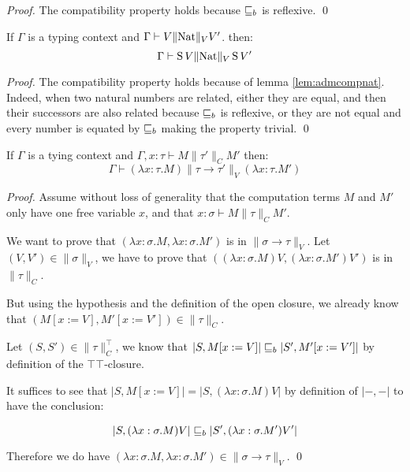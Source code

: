 \begin{proof}
The compatibility property holds 
because $\sqsubseteq_b$ is reflexive. 
\qed\end{proof}

\begin{alemma}
    If $\Gamma$ is a typing context and $\Gamma \vdash V \| \textnormal{Nat} \|_V V'$. 
    then:
    \begin{equation*}
        \Gamma \vdash \operatorname{S} V \| \textnormal{Nat} \|_V \operatorname{S} V'
    \end{equation*}
\end{alemma}
\begin{proof}
The compatibility property
holds because of lemma \ref{lem:admcompnat}. Indeed, 
when two natural numbers are related, either they 
are equal, and then their successors are also related 
because $\sqsubseteq_b$ is reflexive, or they are not 
equal and every number is equated by $\sqsubseteq_b$ 
making the property trivial. 
\qed\end{proof}

\begin{alemma}
    If $\Gamma$ is a tying context and 
    $\Gamma, x :\tau \vdash M \| \tau' \|_C M'$ then:
    \begin{equation*}
        \Gamma \vdash (\lambda x:\tau. M) \| \tau \to \tau' \|_V (\lambda
        x:\tau. M')
    \end{equation*}
\end{alemma}
\begin{proof}
Assume without loss of generality 
that the computation terms 
$M$ and $M'$ only have one free variable $x$,
and that $x : \sigma \vdash M \| \tau \|_C M'$.

We want to prove that $(\lambda x:\sigma .M, \lambda x:\sigma. M')$
is in $\| \sigma \to \tau\|_V$. Let $(V,V') \in \| \sigma \|_V$,
we have to prove that $((\lambda x:\sigma. M)V, (\lambda x:\sigma.
M')V')$ is in $\| \tau \|_C$.

But using the hypothesis and 
the definition of the open closure, 
we already know that 
$(M[x := V], M'[x := V']) \in \| \tau \|_C$.

Let $(S,S') \in \| \tau \|_C^\top$, we know that 
$|S, M[x := V]| \sqsubseteq_b |S', M'[x := V']|$ by definition 
of the $\top\top$-closure. 

It suffices to see that $|S, M[x := V]| = |S, (\lambda x:\sigma. M)
V|$ by definition of $|-,-|$ to have the conclusion:

\begin{equation*}
    | S, (\lambda x:\sigma. M) V| \sqsubseteq_b |S', (\lambda x:\sigma.
    M') V'| 
\end{equation*}

Therefore we do have $(\lambda x:\sigma. M, \lambda x:\sigma. M')
\in \| \sigma \to \tau \|_V$.
\qed\end{proof}

